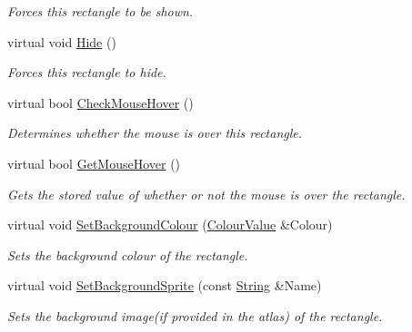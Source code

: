 \begin{DoxyCompactItemize}
\begin{DoxyCompactList}\small\item\em Forces this rectangle to be shown. \item\end{DoxyCompactList}\item 
\hypertarget{classphys_1_1UI_1_1Rectangle_a25bad72cff62c5c69b224bcb74304661}{
virtual void \hyperlink{classphys_1_1UI_1_1Rectangle_a25bad72cff62c5c69b224bcb74304661}{Hide} ()}
\label{d1/d5d/classphys_1_1UI_1_1Rectangle_a25bad72cff62c5c69b224bcb74304661}

\begin{DoxyCompactList}\small\item\em Forces this rectangle to hide. \item\end{DoxyCompactList}\item 
virtual bool \hyperlink{classphys_1_1UI_1_1Rectangle_a246070a93416c2c50d63720b354154d7}{CheckMouseHover} ()
\begin{DoxyCompactList}\small\item\em Determines whether the mouse is over this rectangle. \item\end{DoxyCompactList}\item 
virtual bool \hyperlink{classphys_1_1UI_1_1Rectangle_a20903adb6d1b8650d73774190a2b9c57}{GetMouseHover} ()
\begin{DoxyCompactList}\small\item\em Gets the stored value of whether or not the mouse is over the rectangle. \item\end{DoxyCompactList}\item 
virtual void \hyperlink{classphys_1_1UI_1_1Rectangle_ac777c61b1019c3a679bc121e533e2799}{SetBackgroundColour} (\hyperlink{classphys_1_1ColourValue}{ColourValue} \&Colour)
\begin{DoxyCompactList}\small\item\em Sets the background colour of the rectangle. \item\end{DoxyCompactList}\item 
virtual void \hyperlink{classphys_1_1UI_1_1Rectangle_ae9cc47125e075aaa9bfd397762de6e0c}{SetBackgroundSprite} (const \hyperlink{namespacephys_aa03900411993de7fbfec4789bc1d392e}{String} \&Name)
\begin{DoxyCompactList}\small\item\em Sets the background image(if provided in the atlas) of the rectangle. \item\end{DoxyCompactList}\item 

\end{DoxyCompactItemize}
